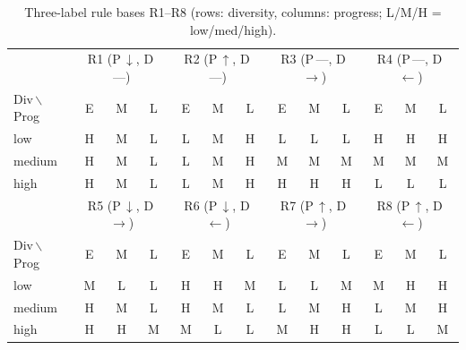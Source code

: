 \documentclass[runningheads]{llncs}
\begin{document}
\begin{table}[H]
\scriptsize
\centering
\vspace{3pt}
\caption{Three-label rule bases R1--R8 (rows: diversity, columns: progress; L/M/H = low/med/high).}\label{tab:rules3L}
\setlength{\tabcolsep}{4pt}
\begin{tabular}{l|ccc|ccc|ccc|ccc}
\toprule
& \multicolumn{3}{c|}{R1 (P\,$\downarrow$, D\,---)}
& \multicolumn{3}{c|}{R2 (P\,$\uparrow$, D\,---)}
& \multicolumn{3}{c|}{R3 (P\,---, D\,$\rightarrow$)}
& \multicolumn{3}{c}{R4 (P\,---, D\,$\leftarrow$)} \\
Div\,$\backslash$\,Prog & E & M & L & E & M & L & E & M & L & E & M & L \\
\midrule
low    & H & M & L & L & M & H & L & L & L & H & H & H \\
medium & H & M & L & L & M & H & M & M & M & M & M & M \\
high   & H & M & L & L & M & H & H & H & H & L & L & L \\
\bottomrule
\toprule
& \multicolumn{3}{c|}{R5 (P\,$\downarrow$, D\,$\rightarrow$)}
& \multicolumn{3}{c|}{R6 (P\,$\downarrow$, D\,$\leftarrow$)}
& \multicolumn{3}{c|}{R7 (P\,$\uparrow$, D\,$\rightarrow$)}
& \multicolumn{3}{c}{R8 (P\,$\uparrow$, D\,$\leftarrow$)} \\
Div\,$\backslash$\,Prog & E & M & L & E & M & L & E & M & L & E & M & L \\
\midrule
low    & M & L & L & H & H & M & L & L & M & M & H & H \\
medium & H & M & L & H & M & L & L & M & H & L & M & H \\
high   & H & H & M & M & L & L & M & H & H & L & L & M \\
\bottomrule
\end{tabular}


\end{table}
\end{document}
